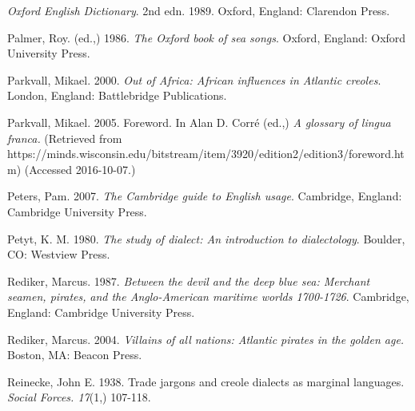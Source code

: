 \begin{styleStandard}
\textit{Oxford English Dictionary}. 2nd edn. 1989. Oxford, England: Clarendon Press. 
\end{styleStandard}


\begin{styleStandard}
Palmer, Roy. (ed.,) 1986. \textit{The Oxford book of sea songs}. Oxford, England: Oxford University Press. 
\end{styleStandard}


\begin{styleStandard}
Parkvall, Mikael. 2000. \textit{Out of Africa: African influences in Atlantic creoles}. London, England: Battlebridge Publications.
\end{styleStandard}


\begin{styleStandard}
Parkvall, Mikael. 2005. Foreword. In Alan D. Corré (ed.,) \textit{A glossary of lingua franca. }(Retrieved from https://minds.wisconsin.edu/bitstream/item/3920/edition2/edition3/foreword.htm) (Accessed 2016-10-07.)
\end{styleStandard}


\begin{styleStandard}
Peters, Pam. 2007. \textit{The Cambridge guide to English usage}. Cambridge, England: Cambridge University Press.
\end{styleStandard}


\begin{styleStandard}
Petyt, K. M. 1980. \textit{The study of dialect: An introduction to dialectology}. Boulder, CO: Westview Press.
\end{styleStandard}


\begin{styleStandard}
Rediker, Marcus. 1987. \textit{Between the devil and the deep blue sea: Merchant seamen, pirates,} \textit{and the Anglo-American maritime worlds 1700-1726}. Cambridge, England:\textit{ }Cambridge University Press. 
\end{styleStandard}


\begin{styleStandard}
Rediker, Marcus. 2004. \textit{Villains of all nations: Atlantic pirates in the golden age. }Boston, MA: Beacon Press.
\end{styleStandard}


\begin{styleStandard}
Reinecke, John E. 1938. Trade jargons and creole dialects as marginal languages. \textit{Social Forces. 17}(1,) 107-118. 
\end{styleStandard}



